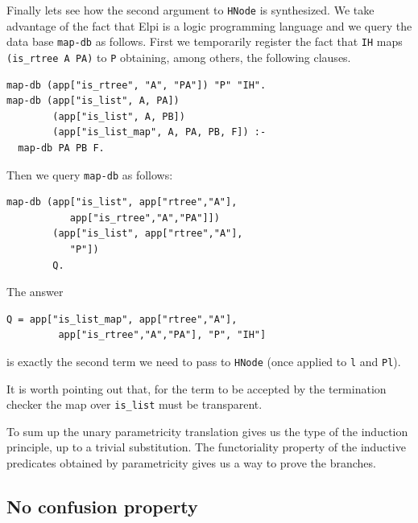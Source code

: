 \documentclass[sigplan,10pt,review]{acmart}\settopmatter{printfolios=true,printccs=false,printacmref=false}
\begin{document}
Finally lets see  how the second argument to \lstinline+HNode+ is
synthesized.  We take advantage of the fact that Elpi is a logic
programming language and we query the data base \lstinline+map-db+
as follows. First we temporarily register 
the fact that \lstinline+IH+ maps
\lstinline+(is_rtree A PA)+ to \lstinline+P+ obtaining, among others,
the following clauses.

\begin{minipage}{\textwidth}\begin{lstlisting}[]
map-db (app["is_rtree", "A", "PA"]) "P" "IH".
map-db (app["is_list", A, PA])
        (app["is_list", A, PB])
        (app["is_list_map", A, PA, PB, F]) :-
  map-db PA PB F.
\end{lstlisting}\end{minipage}

Then we query \lstinline+map-db+ as follows:

\begin{minipage}{\textwidth}\begin{lstlisting}[]
map-db (app["is_list", app["rtree","A"],
           app["is_rtree","A","PA"]])
        (app["is_list", app["rtree","A"],
           "P"])
        Q.
\end{lstlisting}\end{minipage}

\noindent
The answer

\begin{minipage}{\textwidth}\begin{lstlisting}[]
Q = app["is_list_map", app["rtree","A"],
         app["is_rtree","A","PA"], "P", "IH"]
\end{lstlisting}\end{minipage}

\noindent
is exactly the second term we need to pass to \lstinline+HNode+
(once applied to \lstinline+l+ and \lstinline+Pl+).

It is worth pointing out that, for the term to be accepted
by the termination checker the map over \lstinline+is_list+
must be transparent.

To sum up the unary parametricity translation gives us the type
of the induction principle, up to a trivial substitution.
The functoriality property of the inductive predicates obtained by
parametricity gives us a way to prove the branches.

\subsection{No confusion property} %
\end{document}
